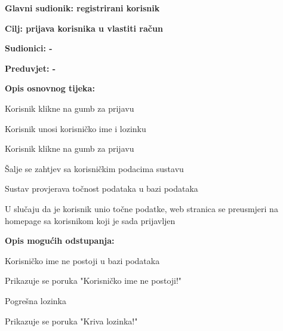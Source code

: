 				
					\noindent {}
					\begin{packed_item}
						\item \textbf{Glavni sudionik: registrirani korisnik}
						\item  \textbf{Cilj: prijava korisnika u vlastiti račun}
						\item  \textbf{Sudionici: -}
						\item  \textbf{Preduvjet: -}
						
						\item  \textbf{Opis osnovnog tijeka:}
						\item[] \begin{packed_enum}
							\item Korisnik klikne na gumb za prijavu
							\item Korisnik unosi korisničko ime i lozinku
							\item Korisnik klikne na gumb za prijavu
							\item Šalje se zahtjev sa korisničkim podacima sustavu
							\item Sustav provjerava točnost podataka u bazi podataka
							\item U slučaju da je korisnik unio točne podatke, web stranica se preusmjeri na homepage sa korisnikom koji je sada prijavljen
						\end{packed_enum}
						
						\item  \textbf{Opis mogućih odstupanja:}
						\item[] \begin{packed_item}
							\item[5.a] Korisničko ime ne postoji u bazi podataka
							\begin{packed_enum}
								\item Prikazuje se poruka "Korisničko ime ne postoji!"
							\end{packed_enum}
							\item[5.b] Pogrešna lozinka
							\begin{packed_enum}
								\item Prikazuje se poruka "Kriva lozinka!"
							\end{packed_enum}
						\end{packed_item}
					\end{packed_item}


